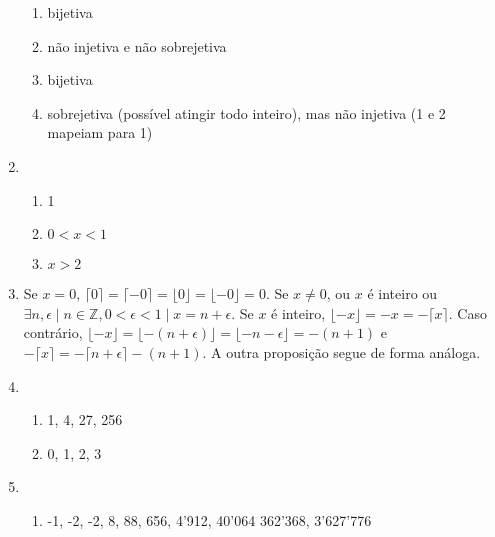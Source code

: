 \documentclass{article}
\begin{document}
\begin{enumerate}
\begin{enumerate}
            \item bijetiva

            \item não injetiva e não sobrejetiva

            \item bijetiva

            \item sobrejetiva (possível atingir todo inteiro), mas não injetiva (1 e 2 mapeiam para 1)

        \end{enumerate}

    \item 

        \begin{enumerate}

            \item 1

            \item \( 0 < x < 1 \)

            \item \( x > 2 \)

        \end{enumerate}

    \item Se \( x=0 \), \( \lceil 0 \rceil = \lceil -0 \rceil = \lfloor 0 \rfloor = \lfloor -0 \rfloor = 0 \). Se \( x \neq  0 \), ou \( x \) é inteiro ou \( \exists n, \epsilon \mid n \in \mathbb{Z}, 0 < \epsilon < 1 \mid x = n + \epsilon \). Se \( x \) é inteiro, \( \lfloor -x \rfloor = -x = - \lceil x \rceil\). Caso contrário, \( \lfloor -x \rfloor = \lfloor -(n + \epsilon)  \rfloor = \lfloor - n - \epsilon  \rfloor = -(n +1)\) e \( - \lceil x \rceil = - \lceil n + \epsilon \rceil - (n+1)\). A outra proposição segue de forma análoga.

    \item 

        \begin{enumerate}

            \item 1, 4, 27, 256
            \item 0, 1, 2, 3

        \end{enumerate}

    \item 

        \begin{enumerate}

            \item -1, -2, -2, 8, 88, 656, 4'912, 40'064 362'368, 3'627'776


\end{enumerate}
\end{enumerate}
\end{document}
